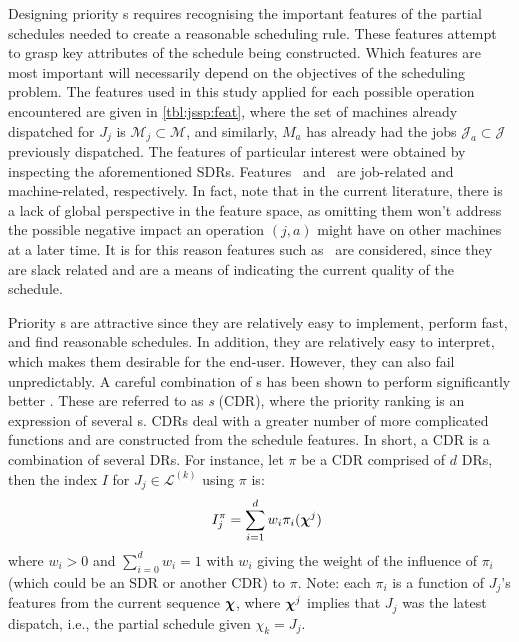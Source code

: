 \documentclass[twocolumn]{svjour3}
\begin{document}
Designing priority \dr s requires recognising the important features of the 
partial schedules needed to create a reasonable scheduling rule. 
These features attempt to grasp key attributes of the schedule being 
constructed. Which features are most important will necessarily depend on the
objectives of the scheduling problem. 
The features used in this study applied for each possible operation encountered 
are given in \cref{tbl:jssp:feat}, where the set of machines already dispatched 
for $J_j$ is $\mathcal{M}_j\subset\mathcal{M}$, and similarly, $M_a$ has 
already had the jobs $\mathcal{J}_a\subset\mathcal{J}$ previously dispatched.
The features of particular interest were obtained by inspecting the 
aforementioned SDRs. Features \phiJobRelated\ and \phiMacRelated\ are 
job-related and machine-related, respectively.
In fact, \cite{Pickardt2013} note that in the current literature, there is a 
lack of global perspective in the feature space, as omitting them won't 
address the possible negative impact an operation $(j,a)$ might have on other 
machines at a later time. It is for this reason features such as 
\phiSlackRelated\ are considered, since they are slack related and are a means 
of indicating the current quality of the schedule.

Priority \dr s are attractive since they are relatively easy to 
implement, perform fast, and find reasonable schedules. In addition, they are 
relatively easy to interpret, which makes them desirable for the end-user.
However, they can also fail unpredictably. 
A careful combination of \dr s has been shown to perform significantly better 
\cite{Jayamohan04}. These are referred to as \emph{\cdr s} 
(CDR), where the priority ranking is an expression of several \dr s. 
CDRs deal with a greater number of more complicated functions and are 
constructed from the schedule features. In short, a CDR is a combination 
of several DRs. 
For instance, let $\pi$ be a CDR comprised of $d$ DRs, then the index $I$ for 
$J_j\in\mathcal{L}^{(k)}$ using $\pi$ is:
\begin{equation}\quad I_j^{\pi} = \sum_{i=1}^d w_i \pi_i(\bm \chi^j) 
\label{eq:CDR}
\end{equation}
where $w_i>0$ and $\sum_{i=0}^d w_i = 1$ with $w_i$ giving the weight of the 
influence of $\pi_i$ (which could be an SDR or another CDR) to $\pi$. Note: 
each $\pi_i$ is a function of $J_j$'s features from the current sequence 
$\bm \chi$, where $\bm \chi^j$ implies that $J_j$ was the latest dispatch, i.e., the 
partial schedule given $\chi_k=J_j$.
\end{document}
